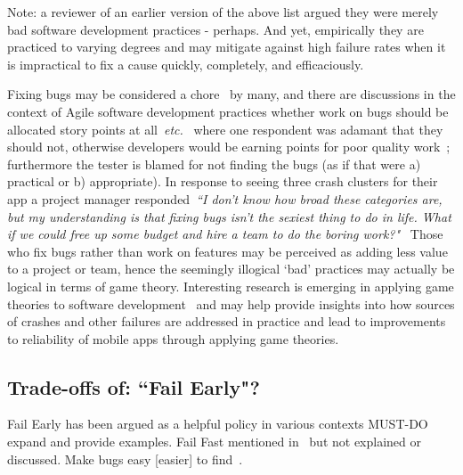 Note: a reviewer of an earlier version of the above list argued they were merely bad software development practices - perhaps. And yet, empirically they are practiced to varying degrees and may mitigate against high failure rates when it is impractical to fix a cause quickly, completely, and efficaciously.

Fixing bugs may be considered a chore~ by many, and there are discussions in the context of Agile software development practices whether work on bugs should be allocated story points at all~\emph{etc.}~ where one respondent was adamant that they should not, otherwise developers would be earning points for poor quality work~; furthermore the tester is blamed for not finding the bugs (as if that were a) practical or b) appropriate). In response to seeing three crash clusters for their app a project manager responded~\emph{``I don’t know how broad these categories are, but my understanding is that fixing bugs isn’t the sexiest thing to do in life. What if we could free up some budget and hire a team to do the boring work?"}~  Those who fix bugs rather than work on features may be perceived as adding less value to a project or team, hence the seemingly illogical `bad' practices may actually be logical in terms of game theory. Interesting research is emerging in applying game theories to software development~ and may help provide insights into how sources of crashes and other failures are addressed in practice and lead to improvements to reliability of mobile apps through applying game theories.


\subsection{Trade-offs of: ``Fail Early"?}
Fail Early has been argued as a helpful policy in various contexts MUST-DO expand and provide examples. Fail Fast mentioned in~ but not explained or discussed. Make bugs easy [easier] to find~.

